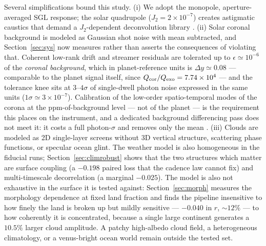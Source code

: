 \documentclass[twocolumn,10pt]{article}
\begin{document}
Several simplifications bound this study.
(i) We adopt the monopole, aperture-averaged SGL response; the solar
quadrupole ($J_2=2\times10^{-7}$) creates astigmatic caustics that demand
a $J_2$-dependent deconvolution library \citep{tt21quad}.
(ii) Solar coronal background is modeled as Gaussian shot noise with mean
subtracted, and Section~\ref{sec:sys} now measures rather than asserts the
consequences of violating that. Coherent low-rank drift and streamer residuals
are tolerated up to $\epsilon\simeq10^{-6}$ of the \emph{coronal background},
which in planet-reference units is $\Delta y\simeq0.08$ --- comparable to the
planet signal itself, since $Q_{\rm cor}/Q_{\rm exo}=7.74\times10^{4}$ --- and
the tolerance knee sits at $3$--$4\sigma$ of single-dwell photon noise expressed
in the same units ($1\sigma\simeq3\times10^{-7}$). Calibration of the low-order
spatio-temporal modes of the corona at the ppm-of-background level --- not of the
planet --- is the requirement this places on the instrument, and a dedicated
background differencing pass does not meet it: it costs a full photon-$\sigma$
and removes only the mean \citep{tur26bench}.
(iii) Clouds are modeled as 2D single-layer screens without 3D vertical
structure, scattering phase functions, or specular ocean glint.
The weather model is also homogeneous in the fiducial runs;
Section~\ref{sec:climrobust} shows that the two structures which matter are
surface coupling (a $-0.198$ paired loss that the cadence law cannot fix) and
multi-timescale decorrelation (a marginal $-0.025$). The model is also not
exhaustive in the surface it is tested against: Section~\ref{sec:morph} measures
the morphology dependence at fixed land fraction and finds the pipeline
insensitive to how finely the land is broken up but mildly sensitive --- $-0.040$
in $r$, $\sim12\%$ --- to how coherently it is concentrated, because a single
large continent generates a $10.5\%$ larger cloud amplitude. A patchy
high-albedo cloud field, a heterogeneous climatology, or a venus-bright ocean
world remain outside the tested set.
\end{document}
